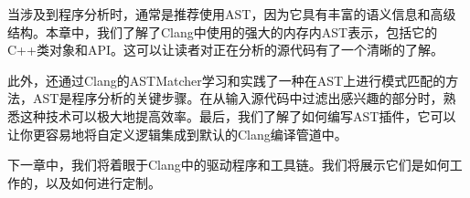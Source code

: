 当涉及到程序分析时，通常是推荐使用AST，因为它具有丰富的语义信息和高级结构。本章中，我们了解了Clang中使用的强大的内存内AST表示，包括它的C++类对象和API。这可以让读者对正在分析的源代码有了一个清晰的了解。

此外，还通过Clang的ASTMatcher学习和实践了一种在AST上进行模式匹配的方法，AST是程序分析的关键步骤。在从输入源代码中过滤出感兴趣的部分时，熟悉这种技术可以极大地提高效率。最后，我们了解了如何编写AST插件，它可以让你更容易地将自定义逻辑集成到默认的Clang编译管道中。

下一章中，我们将着眼于Clang中的驱动程序和工具链。我们将展示它们是如何工作的，以及如何进行定制。
